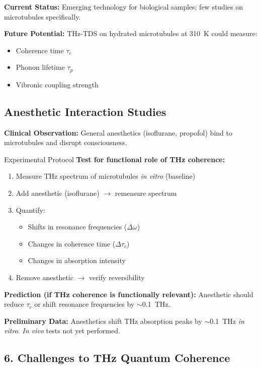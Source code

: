 \textbf{Current Status:} Emerging technology for biological samples; few studies on microtubules specifically.

\textbf{Future Potential:} THz-TDS on hydrated microtubules at 310~K could measure:
\begin{itemize}
\item Coherence time $\tau_c$
\item Phonon lifetime $\tau_p$  
\item Vibronic coupling strength
\end{itemize}

\subsection{Anesthetic Interaction Studies}
\label{subsec:app-anesthetics}

\textbf{Clinical Observation:} General anesthetics (isoflurane, propofol) bind to microtubules and disrupt consciousness.

\begin{calloutbox}{Experimental Protocol}
\textbf{Test for functional role of THz coherence:}

\begin{enumerate}
\item Measure THz spectrum of microtubules \textit{in vitro} (baseline)
\item Add anesthetic (isoflurane) $\rightarrow$ remeasure spectrum
\item Quantify:
  \begin{itemize}
  \item Shifts in resonance frequencies ($\Delta\omega$)
  \item Changes in coherence time ($\Delta\tau_c$)
  \item Changes in absorption intensity
  \end{itemize}
\item Remove anesthetic $\rightarrow$ verify reversibility
\end{enumerate}

\textbf{Prediction (if THz coherence is functionally relevant):} Anesthetic should reduce $\tau_c$ or shift resonance frequencies by $\sim$0.1~THz.

\textbf{Preliminary Data:} Anesthetics shift THz absorption peaks by $\sim$0.1~THz \textit{in vitro}. \textit{In vivo} tests not yet performed.
\end{calloutbox}

\subsection{6. Challenges to THz Quantum
Coherence}\label{challenges-to-thz-quantum-coherence}

